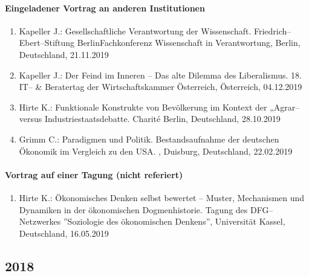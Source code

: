 \paragraph{Eingeladener Vortrag an anderen Institutionen}
\begin{enumerate}
	\item Kapeller J.: Gesellschaftliche Verantwortung der Wissenschaft. Friedrich--Ebert--Stiftung BerlinFachkonferenz Wissenschaft in Verantwortung, Berlin, Deutschland, 21.11.2019
	\item Kapeller J.: Der Feind im Inneren – Das alte Dilemma des Liberalismus. 18. IT-- \& Beratertag der Wirtschaftskammer Österreich, Österreich, 04.12.2019
	\item Hirte K.: Funktionale Konstrukte von Bevölkerung im Kontext der „Agrar-- versus Industriestaatsdebatte. Charité Berlin, Deutschland, 28.10.2019
	\item Grimm C.: Paradigmen und Politik. Bestandsaufnahme der deutschen Ökonomik im Vergleich zu den USA. , Duisburg, Deutschland, 22.02.2019
\end{enumerate}
\paragraph{Vortrag auf einer Tagung (nicht referiert)}
\begin{enumerate}
	\item Hirte K.: Ökonomisches Denken selbst bewertet – Muster, Mechanismen und Dynamiken in der ökonomischen Dogmenhistorie. Tagung des DFG--Netzwerkes ''Soziologie des ökonomischen Denkens'', Universität Kassel, Deutschland, 16.05.2019
\end{enumerate}
\subsection*{2018}
